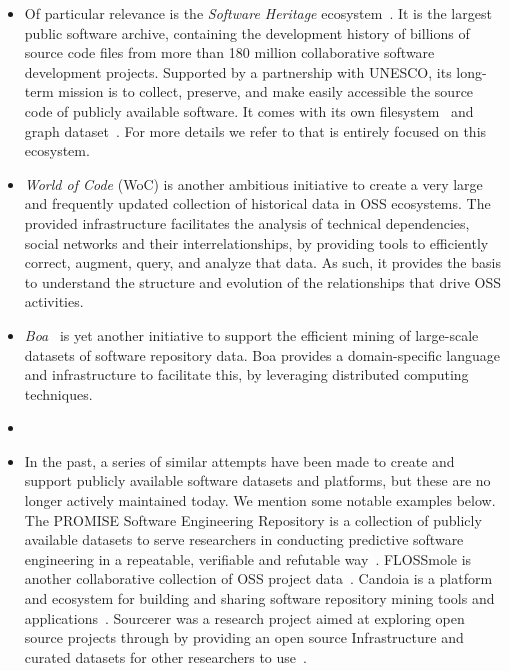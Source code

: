 \begin{itemize}
    \item Of particular relevance is the \emph{Software Heritage} ecosystem~\cite{swhipres2017}.  It is the largest public software archive,
          containing the development history of billions of source code files from more than 180 million collaborative software development projects.
          Supported by a partnership with UNESCO, its long-term mission is to collect, preserve, and make easily accessible the source code of publicly available software. It comes with its own filesystem~\cite{swh-fuse-icse2021} and graph dataset~\cite{msr-2020-challenge}. For more details we refer to  that is entirely focused on this ecosystem.

    \item \emph{World of Code} (WoC) \cite{mockus2019woc, Ma2021WoC} is another ambitious initiative to create a very large and frequently updated collection of historical data in OSS ecosystems. The provided infrastructure facilitates the analysis of technical dependencies, social networks and their interrelationships, by providing tools to efficiently correct, augment, query, and analyze that data. As such, it provides the basis to understand the structure and evolution of the relationships that drive OSS activities.

    \item \emph{Boa}~\cite{dyer2013boa,dyer2015boa,Boa2020MSR} is yet another initiative to support the efficient mining of large-scale datasets of software repository data. Boa provides a domain-specific language and infrastructure to facilitate this, by leveraging distributed computing techniques.

    \item {}
    \item In the past, a series of similar attempts have been made to create and support publicly available software datasets and platforms, but these are no longer actively maintained today. We mention some notable examples below.
          The PROMISE Software Engineering Repository is a collection of publicly available datasets to serve researchers in conducting predictive software engineering  in a  repeatable, verifiable and refutable way~\cite{PROMISE2005}. %
          FLOSSmole is another collaborative collection of OSS project data~\cite{FLOSSmole}. %
          Candoia is a platform and ecosystem for building and sharing software repository mining tools and applications~\cite{Candoia2016, 7962355}. %
          Sourcerer was a research project aimed at exploring open source projects through by providing an open source Infrastructure and curated datasets for other researchers to use~\cite{Sourcerer2014}.


\end{itemize}
